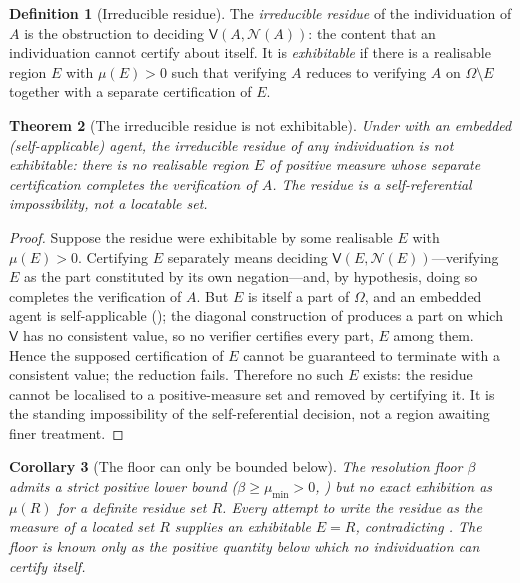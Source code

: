 \documentclass[11pt,a4paper]{article}
\theoremstyle{thmstyle}
\newtheorem{theorem}{Theorem}[section]
\newtheorem{corollary}[theorem]{Corollary}
\theoremstyle{definition}
\newtheorem{definition}[theorem]{Definition}
\theoremstyle{remark}
\newcommand{\Space}{\Omega}
\newcommand{\thick}{\beta}
\newcommand{\Neg}{\mathcal{N}}
\newcommand{\Ver}{\mathsf{V}}
\begin{document}
\begin{definition}[Irreducible residue]
\label{def:irreducible}
The \emph{irreducible residue} of the individuation of $A$ is the obstruction to
deciding $\Ver(A,\Neg(A))$: the content that an individuation cannot certify
about itself. It is \emph{exhibitable} if there is a realisable region $E$ with
$\mu(E)>0$ such that verifying $A$ reduces to verifying $A$ on $\Space\setminus E$
together with a separate certification of $E$.
\end{definition}

\begin{theorem}[The irreducible residue is not exhibitable]
\label{thm:residue-not-measure}
Under  with an embedded \textup{(}self-applicable\textup{)} agent,
the irreducible residue of any individuation is not exhibitable: there is no
realisable region $E$ of positive measure whose separate certification completes
the verification of $A$. The residue is a self-referential impossibility, not a
locatable set.
\end{theorem}

\begin{proof}
Suppose the residue were exhibitable by some realisable $E$ with $\mu(E)>0$.
Certifying $E$ separately means deciding $\Ver(E,\Neg(E))$---verifying $E$ as the
part constituted by its own negation---and, by hypothesis, doing so completes the
verification of $A$. But $E$ is itself a part of $\Space$, and an embedded agent
is self-applicable (); the diagonal construction of
 produces a part on which $\Ver$ has no consistent value, so no
verifier certifies every part, $E$ among them. Hence the supposed certification
of $E$ cannot be guaranteed to terminate with a consistent value; the reduction
fails. Therefore no such $E$ exists: the residue cannot be localised to a
positive-measure set and removed by certifying it. It is the standing
impossibility of the self-referential decision, not a region awaiting finer
treatment.
\end{proof}

\begin{corollary}[The floor can only be bounded below]
\label{cor:floor-only-bounded}
The resolution floor $\thick$ admits a strict positive lower bound
\textup{(}$\thick\ge\mu_{\min}>0$, \textup{)} but no exact
exhibition as $\mu(R)$ for a definite residue set $R$. Every attempt to write the
residue as the measure of a located set $R$ supplies an exhibitable $E=R$,
contradicting . The floor is known only as the
positive quantity below which no individuation can certify itself.
\end{corollary}
\end{document}

